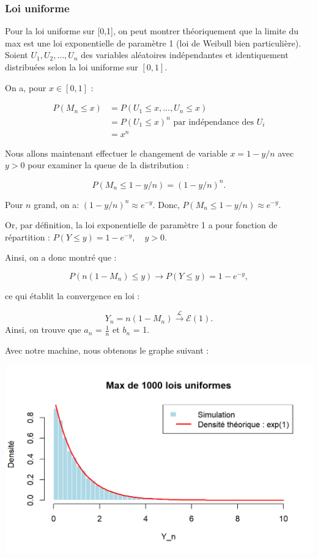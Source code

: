 \documentclass{article}
\begin{document}
\subsubsection{Loi uniforme}

\noindent Pour la loi uniforme sur [0,1], on peut montrer théoriquement que la limite du max est une loi exponentielle de paramètre 1 (loi de Weibull bien particulière). \\
\noindent Soient \( U_1, U_2, \dots, U_n \) des variables aléatoires indépendantes et identiquement distribuées selon la loi uniforme sur \([0,1]\).

\noindent On a, pour $ x \in [0,1]$ :

\begin{align*}
	P(M_n \leq x) &= P(U_1 \leq x, \dots, U_n \leq x) \\
	&= P(U_1 \leq x)^n \text{ par indépendance des $U_i$}\\
	&= x^n
\end{align*}

\noindent Nous allons maintenant effectuer le changement de variable $ x = 1 - y/n $ avec $y > 0 $ pour examiner la queue de la distribution :

\[
P(M_n \leq 1 - y/n) = (1 - y/n)^n.
\]

\noindent Pour $ n $ grand, on a: $(1 - y/n)^n \approx e^{-y} $. Donc, $ P(M_n \leq 1 - y/n) \approx e^{-y} $.


\noindent Or, par définition, la loi exponentielle de paramètre 1 a pour fonction de répartition : $ P(Y \leq y) = 1 - e^{-y}, \quad y > 0. $

\noindent Ainsi, on a donc montré que :

\[
P(n(1 - M_n) \leq y) \to P(Y \leq y) = 1 - e^{-y},
\]

\noindent ce qui établit la convergence en loi :

\[
Y_n = n(1 - M_n) \xrightarrow{\mathcal{L}} \mathcal{E}(1).
\] 
\noindent Ainsi, on trouve que $a_n$ = $\frac{1}{n}$ et $b_n$ = 1.

\noindent Avec notre machine, nous obtenons le graphe suivant :

\begin{center}
	\includegraphics[scale=0.8]{./images/Max_Uniforme.png} 
\end{center}
\end{document}
